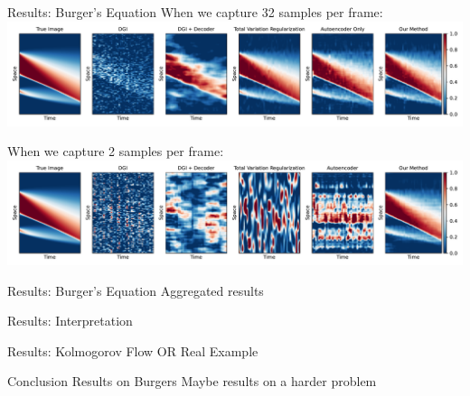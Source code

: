 \documentclass[8pt]{beamer}
\begin{document}
\begin{frame}{Results: Burger's Equation}
	When we capture 32 samples per frame:
	\includegraphics[width=\textwidth]{Figures/cs_burgers_comparison_32.pdf}
	
	When we capture 2 samples per frame:
	\includegraphics[width=\textwidth]{Figures/cs_burgers_comparison_2.pdf}
\end{frame}

\begin{frame}{Results: Burger's Equation}
	Aggregated results
\end{frame}

\begin{frame}{Results: Interpretation}
	
\end{frame}

\begin{frame}{Results: Kolmogorov Flow OR Real Example}
\end{frame}

\begin{frame}{Conclusion}
	Results on Burgers
	Maybe results on a harder problem
\end{frame}

\appendix
\end{document}
